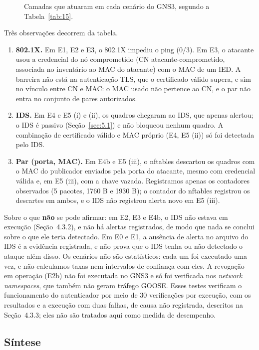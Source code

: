 \documentclass[12pt]{article}
\begin{document}
\begin{figure}[!t]
\centering

\caption{Camadas que atuaram em cada cenário do GNS3, segundo a Tabela~\ref{tab:15}.}\label{fig:8}
\end{figure}

Três observações decorrem da tabela.

\begin{enumerate}
\item \textbf{802.1X.} Em E1, E2 e E3, o 802.1X impediu o ping (0/3). Em E3, o atacante usou a credencial do nó comprometido (CN atacante-comprometido, associada no inventário ao MAC do atacante) com o MAC de um IED. A barreira não está na autenticação TLS, que o certificado válido supera, e sim no vínculo entre CN e MAC: o MAC usado não pertence ao CN, e o par não entra no conjunto de pares autorizados.
\item \textbf{IDS.} Em E4 e E5 (i) e (ii), os quadros chegaram ao IDS, que apenas alertou; o IDS é passivo (Seção~\ref{sec:5.1}) e não bloqueou nenhum quadro. A combinação de certificado válido e MAC próprio (E4, E5 (ii)) só foi detectada pelo IDS.
\item \textbf{Par (porta, MAC).} Em E4b e E5 (iii), o nftables descartou os quadros com o MAC do publicador enviados pela porta do atacante, mesmo com credencial válida e, em E5 (iii), com a chave vazada. Registramos apenas os contadores observados (5 pacotes, 1760 B e 1930 B); o contador do nftables registrou os descartes em ambos, e o IDS não registrou alerta novo em E5 (iii).
\end{enumerate}

Sobre o que \textbf{não} se pode afirmar: em E2, E3 e E4b, o IDS não estava em execução (Seção~4.3.2), e não há alertas registrados, de modo que nada se conclui sobre o que ele teria detectado. Em E0 e E1, a ausência de alerta no arquivo do IDS é a evidência registrada, e não prova que o IDS tenha ou não detectado o ataque além disso. Os cenários não são estatísticos: cada um foi executado uma vez, e não calculamos taxas nem intervalos de confiança com eles. A revogação em operação (E2b) não foi executada no GNS3 e só foi verificada nos \emph{network namespaces}, que também não geram tráfego GOOSE. Esses testes verificam o funcionamento do autenticador por meio de 30 verificações por execução, com os resultados e a execução com duas falhas, de causa não registrada, descritos na Seção~4.3.3; eles não são tratados aqui como medida de desempenho.

\subsection{Síntese}\label{sec:6.5}
\end{document}
